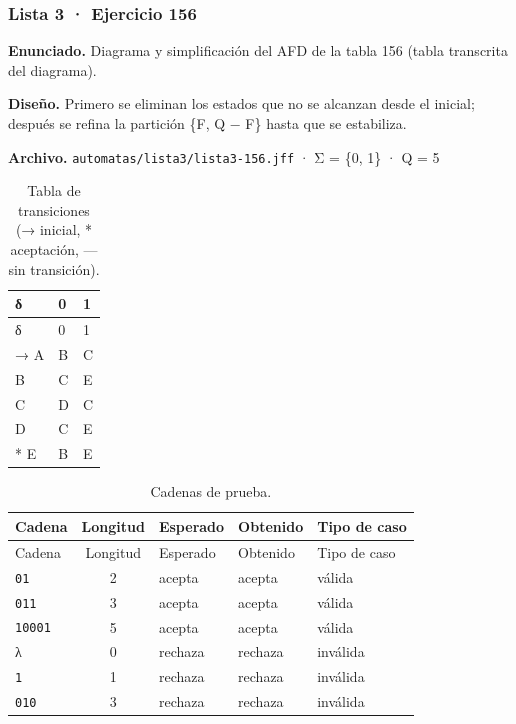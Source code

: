 
\hypertarget{lista-3-ejercicio-156}{%
\subsubsection{Lista 3 · Ejercicio 156}\label{lista-3-ejercicio-156}}

\textbf{Enunciado.} Diagrama y simplificación del AFD de la tabla 156 (tabla transcrita del diagrama).

\textbf{Diseño.} Primero se eliminan los estados que no se alcanzan desde el inicial; después se refina la partición \{F, Q − F\} hasta que se estabiliza.

\textbf{Archivo.} \texttt{automatas/lista3/lista3-156.jff} · Σ = \{0, 1\} · \textbar Q\textbar{} = 5

\begin{longtable}[]{@{}lll@{}}
\caption{Tabla de transiciones (→ inicial, * aceptación, --- sin transición).}\tabularnewline
\toprule\noalign{}
δ & 0 & 1 \\
\midrule\noalign{}
\endfirsthead
\toprule\noalign{}
δ & 0 & 1 \\
\midrule\noalign{}
\endhead
\bottomrule\noalign{}
\endlastfoot
→ A & B & C \\
B & C & E \\
C & D & C \\
D & C & E \\
* E & B & E \\
\end{longtable}

\begin{longtable}[]{@{}lclll@{}}
\caption{Cadenas de prueba.}\tabularnewline
\toprule\noalign{}
Cadena & Longitud & Esperado & Obtenido & Tipo de caso \\
\midrule\noalign{}
\endfirsthead
\toprule\noalign{}
Cadena & Longitud & Esperado & Obtenido & Tipo de caso \\
\midrule\noalign{}
\endhead
\bottomrule\noalign{}
\endlastfoot
\texttt{01} & 2 & acepta & acepta & válida \\
\texttt{011} & 3 & acepta & acepta & válida \\
\texttt{10001} & 5 & acepta & acepta & válida \\
λ & 0 & rechaza & rechaza & inválida \\
\texttt{1} & 1 & rechaza & rechaza & inválida \\
\texttt{010} & 3 & rechaza & rechaza & inválida \\
\end{longtable}

